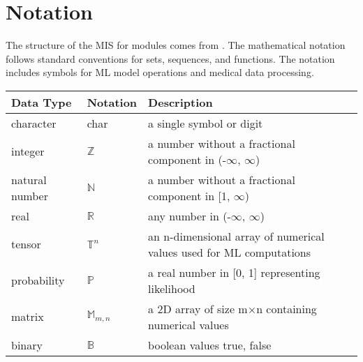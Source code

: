 \documentclass[12pt, titlepage]{article}
\begin{document}
\section{Notation}
The structure of the MIS for modules comes from \citet{HoffmanAndStrooper1995}. The mathematical notation follows standard conventions for sets, sequences, and functions. The notation includes symbols for ML model operations and medical data processing.
\begin{center}
    \renewcommand{\arraystretch}{1.2}
    \noindent 
    \begin{tabular}{l l p{7.5cm}} 
    \toprule 
    \textbf{Data Type} & \textbf{Notation} & \textbf{Description}\\ 
    \midrule
    character & char & a single symbol or digit\\
    integer & $\mathbb{Z}$ & a number without a fractional component in (-$\infty$, $\infty$)\\
    natural number & $\mathbb{N}$ & a number without a fractional component in [1, $\infty$)\\
    real & $\mathbb{R}$ & any number in (-$\infty$, $\infty$)\\
    tensor & $\mathbb{T}^{n}$ & an n-dimensional array of numerical values used for ML computations\\
    probability & $\mathbb{P}$ & a real number in [0, 1] representing likelihood\\
    matrix & $\mathbb{M}_{m,n}$ & a 2D array of size m×n containing numerical values\\
    binary & $\mathbb{B}$ & boolean values {true, false}\\
    \bottomrule
    \end{tabular} 
    \end{center}
\end{document}
